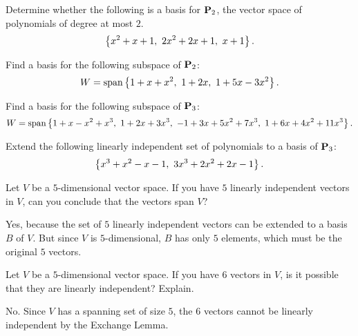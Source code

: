 \begin{ex}
  Determine whether the following is a basis for $\mathbf{P}_2$, the
  vector space of polynomials of degree at most $2$.
  \begin{equation*}
    \left\{x^2+x+1,~2x^2+2x+1,~x+1\right\}.
  \end{equation*}
\end{ex}

\begin{ex}
  Find a basis for the following subspace of $\mathbf{P}_2$:
  \begin{equation*}
    W=\sspan\set{1+x+x^2,~1+2x,~1+5x-3x^2}.
  \end{equation*}
\end{ex}

\begin{ex}
  Find a basis for the following subspace of $\mathbf{P}_3$:
  \begin{equation*}
    W = \sspan\set{
      1+x-x^2+x^3,~1+2x+3x^3,~-1+3x+5x^2+7x^3,~1+6x+4x^2+11x^3}.
  \end{equation*}
\end{ex}

\begin{ex}
  Extend the following linearly independent set of polynomials to a
  basis of $\mathbf{P}_3$:
  \begin{equation*}
    \left\{x^3+x^2-x-1,~3x^3+2x^2+2x-1\right\}.
  \end{equation*}
\end{ex}

\begin{ex}
  Let $V$ be a $5$-dimensional vector space.
  If you have $5$ linearly independent vectors in $V$, can you
  conclude that the vectors span $V$?
  \begin{sol}
    Yes, because the set of $5$ linearly independent vectors can be
    extended to a basis $B$ of $V$. But since $V$ is $5$-dimensional,
    $B$ has only $5$ elements, which must be the original $5$ vectors.
  \end{sol}
\end{ex}

\begin{ex}
  Let $V$ be a $5$-dimensional vector space.  If you have $6$ vectors
  in $V$, is it possible that they are linearly independent? Explain.
  \begin{sol}
    No. Since $V$ has a spanning set of size $5$, the $6$ vectors
    cannot be linearly independent by the Exchange Lemma.
  \end{sol}
\end{ex}


